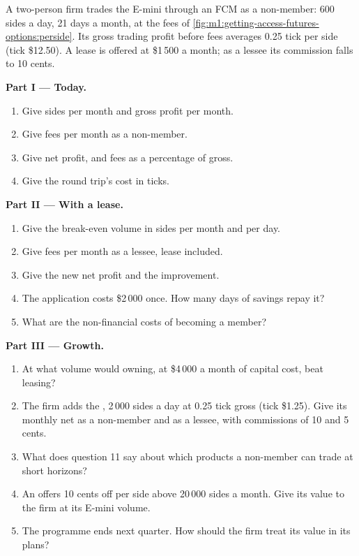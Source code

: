 \begin{problem}\label{pb:m1:getting-access-futures-options:1}
A two-person firm trades the E-mini through an FCM as a non-member: 600
sides a day, 21 days a month, at the fees of
\cref{fig:m1:getting-access-futures-options:perside}. Its gross trading
profit before fees averages 0.25 tick per side (tick \$12.50). A lease is
offered at \$1\,500 a month; as a lessee its commission falls to 10 cents.

\medskip\noindent\textbf{Part I --- Today.}
\begin{enumerate}
\item Give sides per month and gross profit per month.
\item Give fees per month as a non-member.
\item Give net profit, and fees as a percentage of gross.
\item Give the round trip's cost in ticks.
\end{enumerate}

\medskip\noindent\textbf{Part II --- With a lease.}
\begin{enumerate}[resume]
\item Give the break-even volume in sides per month and per day.
\item Give fees per month as a lessee, lease included.
\item Give the new net profit and the improvement.
\item The application costs \$2\,000 once. How many days of savings repay it?
\item What are the non-financial costs of becoming a member?
\end{enumerate}

\medskip\noindent\textbf{Part III --- Growth.}
\begin{enumerate}[resume]
\item At what volume would owning, at \$4\,000 a month of capital cost, beat
leasing?
\item The firm adds the , 2\,000 sides a day at 0.25 tick gross
(tick \$1.25). Give its monthly net as a non-member and as a lessee, with
commissions of 10 and 5 cents.
\item What does question 11 say about which products a non-member can trade
at short horizons?
\item An  offers 10 cents off per side above 20\,000 sides
a month. Give its value to the firm at its E-mini volume.
\item The programme ends next quarter. How should the firm treat its value in
its plans?
\end{enumerate}


\end{problem}
